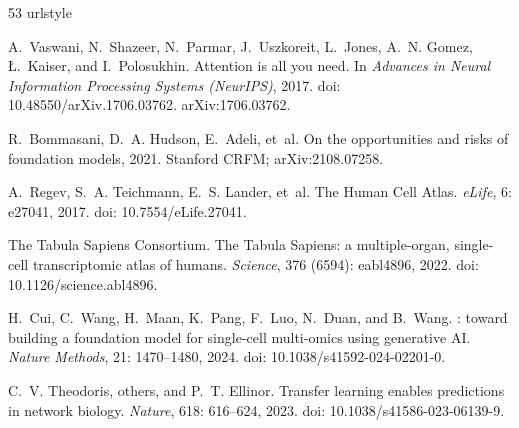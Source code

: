 \documentclass[fleqn,10pt,lineno]{wlpeerj}  %
\begin{document}
\FloatBarrier  %
\begin{thebibliography}{53}
\providecommand{\natexlab}[1]{#1}
\providecommand{\url}[1]{\texttt{#1}}
\expandafter\ifx\csname urlstyle\endcsname\relax
  \providecommand{\doi}[1]{doi: #1}\else
  \providecommand{\doi}{doi: \begingroup \urlstyle{rm}\Url}\fi

A.~Vaswani, N.~Shazeer, N.~Parmar, J.~Uszkoreit, L.~Jones, A.~N. Gomez,
  {\L}.~Kaiser, and I.~Polosukhin.
\newblock Attention is all you need.
\newblock In \emph{Advances in Neural Information Processing Systems
  (NeurIPS)}, 2017.
\newblock \doi{10.48550/arXiv.1706.03762}.
\newblock arXiv:1706.03762.

R.~Bommasani, D.~A. Hudson, E.~Adeli, et~al.
\newblock On the opportunities and risks of foundation models, 2021.
\newblock Stanford CRFM; arXiv:2108.07258.

A.~Regev, S.~A. Teichmann, E.~S. Lander, et~al.
\newblock The {Human Cell Atlas}.
\newblock \emph{eLife}, 6: e27041, 2017.
\newblock \doi{10.7554/eLife.27041}.

{The Tabula Sapiens Consortium}.
\newblock The {Tabula Sapiens}: a multiple-organ, single-cell transcriptomic
  atlas of humans.
\newblock \emph{Science}, 376 (6594): eabl4896, 2022.
\newblock \doi{10.1126/science.abl4896}.

H.~Cui, C.~Wang, H.~Maan, K.~Pang, F.~Luo, N.~Duan, and B.~Wang.
: toward building a foundation model for single-cell
  multi-omics using generative {AI}.
\newblock \emph{Nature Methods}, 21: 1470--1480, 2024.
\newblock \doi{10.1038/s41592-024-02201-0}.

C.~V. Theodoris, others, and P.~T. Ellinor.
\newblock Transfer learning enables predictions in network biology.
\newblock \emph{Nature}, 618: 616--624, 2023.
\newblock \doi{10.1038/s41586-023-06139-9}.


\end{thebibliography}
\end{document}
